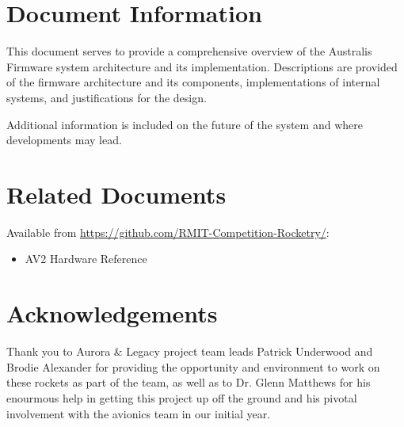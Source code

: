 \documentclass[a4paper, oneside, british]{memoir}
\newcommand{\setdocname}[1]{\def\docname{#1}}
\newcommand{\docname}{}
\newcommand{\setsysname}[1]{\def\sysname{#1}}
\newcommand{\sysname}{}
\newcommand{\setorglabel}[1]{\def\orglabel{#1}}
\newcommand{\orglabel}{}
\newlength{\margindedent}
\numberwithin{figure}{section}
\begin{document}
  \setorglabel{AUSTRALIS AVIONICS} 
  \setsysname{Australis}
  \setdocname{Firmware Design Document}


  \vspace*{-1in}
  \noindent{}

  \vspace*{0.5in}

  \section*{\hspace{-\margindedent}Document Information}
  This document serves to provide a comprehensive overview of the Australis Firmware system architecture and its implementation. Descriptions are provided of the firmware architecture and its components, implementations of internal systems, and justifications for the design. 

  Additional information is included on the future of the system and where developments may lead.
  
  \section*{\hspace{-\margindedent}Related Documents}
  Available from \url{https://github.com/RMIT-Competition-Rocketry/}:
  \vspace{-0.5em}
  \begin{itemize}
    \item AV2 Hardware Reference
  \end{itemize}
  
  \section*{\hspace{-\margindedent}Acknowledgements}
  Thank you to Aurora \& Legacy project team leads Patrick Underwood and Brodie Alexander for providing the opportunity and environment to work on these rockets as part of the team, as well as to Dr. Glenn Matthews for his enourmous help in getting this project up off the ground and his pivotal involvement with the avionics team in our initial year. 
\end{document}
